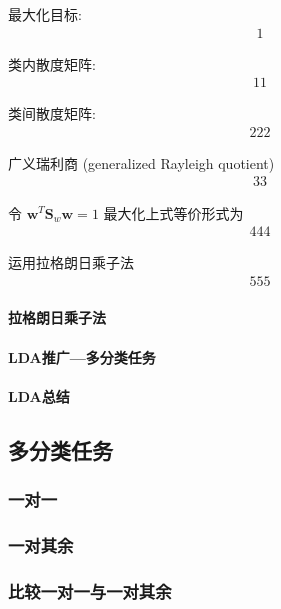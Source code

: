 最大化目标:
\begin{align*}
    1
\end{align*}

类内散度矩阵:
\begin{align*}
    11
\end{align*}

类间散度矩阵:
\begin{align*}
    222
\end{align*}

广义瑞利商 (generalized Rayleigh quotient)
\begin{align*}
    33
\end{align*}

令 $\bm w ^T \bm S_w \bm w=1$ 最大化上式等价形式为
\begin{align*}
    444
\end{align*}

运用拉格朗日乘子法
\begin{align*}
    555
\end{align*}

\paragraph{拉格朗日乘子法}%

\paragraph{LDA推广---多分类任务}

\paragraph{LDA总结}

\subsection{多分类任务}

\subsubsection{一对一}

\subsubsection{一对其余}

\subsubsection{比较一对一与一对其余}

